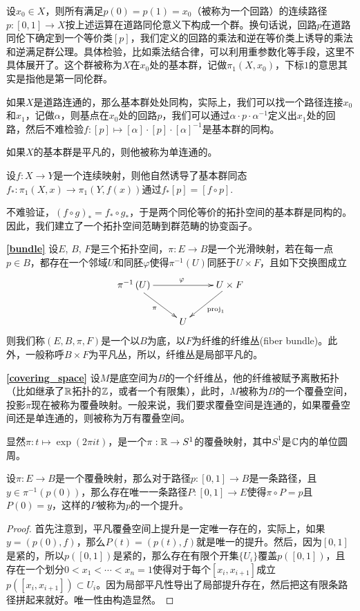 \para 设$x_0\in X$，则所有满足$p(0)=p(1)=x_0$（被称为一个{\kaishu 回路}）的连续路径$p:[0,1]\to X$按上述运算在道路同伦意义下构成一个群。换句话说，回路$p$在道路同伦下确定到一个等价类$[p]$，我们定义的回路的乘法和逆在等价类上诱导的乘法和逆满足群公理。具体检验，比如乘法结合律，可以利用重参数化等手段，这里不具体展开了。这个群被称为$X$在$x_0$处的{\kaishu 基本群}，记做$\pi_1(X,x_0)$，下标$1$的意思其实是指他是第一同伦群。

如果$X$是道路连通的，那么基本群处处同构，实际上，我们可以找一个路径连接$x_0$和$x_1$，记做$\alpha$，则基点在$x_0$处的回路$p$，我们可以通过$\alpha \cdot p \cdot \alpha^{-1}$定义出$x_1$处的回路，然后不难检验$f:[p]\mapsto [\alpha] \cdot [p] \cdot [\alpha]^{-1}$是基本群的同构。

如果$X$的基本群是平凡的，则他被称为{\kaishu 单连通}的。

\para 设$f:X\to Y$是一个连续映射，则他自然诱导了基本群同态$f_*:\pi_1(X,x)\to \pi_1(Y,f(x))$通过$f_*[p]=[f\circ p]$.

不难验证，$(f\circ g)_*=f_*\circ g_*$，于是两个同伦等价的拓扑空间的基本群是同构的。因此，我们建立了一个拓扑空间范畴到群范畴的协变函子。

\textbf{\eqref{bundle}} 设$E$, $B$, $F$是三个拓扑空间，$\pi:E\to B$是一个光滑映射，若在每一点$p\in B$，都存在一个邻域$U$和同胚$\varphi$使得$\pi^{-1}(U)$同胚于$U \times F$，且如下交换图成立
\[
	\xymatrix{
		\pi^{-1}\left(U\right)\ar[rr]^\varphi \ar[dr]_\pi&&U\times F \ar[dl]^{\mathrm{proj}_1}\\
		&U&
		}
\]
则我们称$(E, B, \pi, F)$是一个以$B$为底，以$F$为纤维的纤维丛(fiber bundle)。此外，一般称呼$B\times F$为平凡丛，所以，纤维丛是局部平凡的。

\textbf{\eqref{covering_space}} 设$M$是底空间为$B$的一个纤维丛，他的纤维被赋予离散拓扑（比如继承了$\mathbb{R}$拓扑的$\mathbb{Z}$，或者一个有限集），此时，$M$被称为$B$的一个覆叠空间，投影$\pi$现在被称为覆叠映射。一般来说，我们要求覆叠空间是连通的，如果覆叠空间还是单连通的，则被称为万有覆叠空间。

显然$\pi:t\mapsto \exp(2\pi it)$，是一个$\pi:\mathbb{R} \to S^1$的覆叠映射，其中$S^1$是$\mathbb{C}$内的单位圆周。

\begin{pro}
设$\pi:E\to B$是一个覆叠映射，那么对于路径$p:[0,1]\to B$是一条路径，且$y\in \pi^{-1}(p(0))$，那么存在唯一一条路径$P:[0,1]\to E$使得$\pi\circ P=p$且$P(0)=y$，这样的$P$被称为$p$的一个提升。
\end{pro}

\begin{proof}
首先注意到，平凡覆叠空间上提升是一定唯一存在的，实际上，如果$y=(p(0),f)$，那么$P(t)=(p(t),f)$就是唯一的提升。然后，因为$[0,1]$是紧的，所以$p([0,1])$是紧的，那么存在有限个开集$\{U_i\}$覆盖$p([0,1])$，且存在一个划分$0<x_1<\cdots<x_n=1$使得对于每个$[x_i,x_{i+1}]$成立$p([x_i,x_{i+1}])\subset U_i$。因为局部平凡性导出了局部提升存在，然后把这有限条路径拼起来就好。唯一性由构造显然。
\end{proof}

